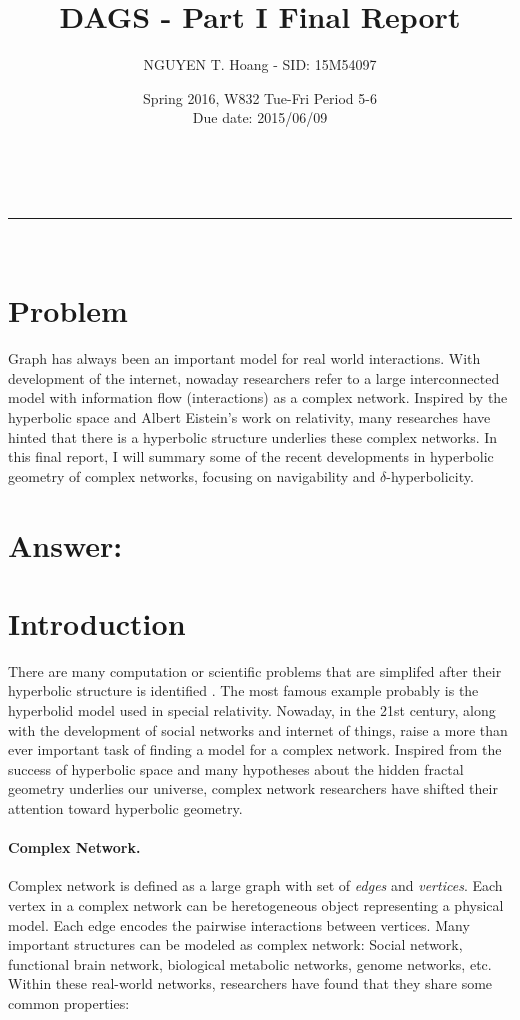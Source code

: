 \documentclass[a4paper,12pt]{article}
\makeatletter
\newcommand{\linia}{\rule{\linewidth}{0.5pt}}
\renewcommand{\maketitle} {
\begin{center}
\vspace{2ex}
{\huge \textsc{\@title}}
\vspace{1ex}
\\
\linia\\
\@author \hfill \@date
\vspace{4ex}
\end{center}
}
\makeatother
\begin{document}

\title{DAGS - Part I Final Report}

\author{NGUYEN T. Hoang - SID: 15M54097}

\date{Spring 2016, W832 Tue-Fri Period 5-6 \\ \hfill Due date: 2015/06/09}

\maketitle

\vspace{10em}
\section*{Problem}
\noindent
Graph has always been an important model for real world interactions. With development of the internet, nowaday researchers refer to a large interconnected model with information flow (interactions) as a complex network. Inspired by the hyperbolic space and Albert Eistein's work on relativity, many researches have hinted that there is a hyperbolic structure underlies these complex networks. In this final report, I will summary some of the recent developments in hyperbolic geometry
of complex networks, focusing on navigability and $\delta$-hyperbolicity.

\vfill
\pagebreak
\section*{Answer:}

\section{Introduction}
There are many computation or scientific problems that are simplifed after their hyperbolic structure is identified \cite{2} \cite{3}. The most famous example probably is the hyperbolid model used in special relativity. Nowaday, in the 21st century, along with the development of social networks and internet of things, raise a more than ever important task of finding a model for a complex network. Inspired from the success of hyperbolic space and many hypotheses about the hidden fractal
geometry underlies our universe, complex network researchers have shifted their attention toward hyperbolic geometry.
\paragraph{Complex Network.} Complex network is defined as a large graph with set of \emph{edges} and \emph{vertices}. Each vertex in a complex network can be heretogeneous object representing a physical model. Each edge encodes the pairwise interactions between vertices. Many important structures can be modeled as complex network: Social network, functional brain network, biological metabolic networks, genome networks, etc. Within these real-world networks, researchers have found
that they share some common properties:
\end{document}
